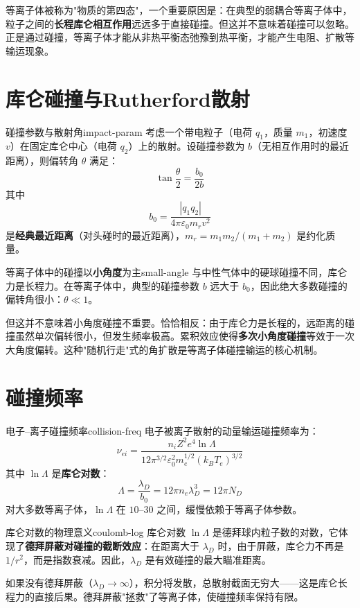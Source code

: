 \documentclass[12pt,a4paper,openany,oneside]{book}
\newcommand{\eps}{\varepsilon}
\newcommand{\difficulty}[1]{\marginnote{\textcolor{red}{\textbf{[#1]}}}}
\begin{document}
等离子体被称为"物质的第四态"，一个重要原因是：在典型的弱耦合等离子体中，粒子之间的\textbf{长程库仑相互作用}远远多于直接碰撞。但这并不意味着碰撞可以忽略。正是通过碰撞，等离子体才能从非热平衡态弛豫到热平衡，才能产生电阻、扩散等输运现象。

\section{库仑碰撞与Rutherford散射}\difficulty{基础}

\begin{definition}{碰撞参数与散射角}{impact-param}
考虑一个带电粒子（电荷 $q_1$，质量 $m_1$，初速度 $v$）在固定库仑中心（电荷 $q_2$）上的散射。设碰撞参数为 $b$（无相互作用时的最近距离），则偏转角 $\theta$ 满足：
\[
\tan\frac{\theta}{2} = \frac{b_0}{2b}
\]
其中
\[
b_0 = \frac{|q_1 q_2|}{4\pi\eps_0 m_r v^2}
\]
是\textbf{经典最近距离}（对头碰时的最近距离），$m_r = m_1 m_2/(m_1+m_2)$ 是约化质量。
\end{definition}

\begin{insight}{等离子体中的碰撞以\textbf{小角度}为主}{small-angle}
与中性气体中的硬球碰撞不同，库仑力是长程力。在等离子体中，典型的碰撞参数 $b$ 远大于 $b_0$，因此绝大多数碰撞的偏转角很小：$\theta \ll 1$。

但这并不意味着小角度碰撞不重要。恰恰相反：由于库仑力是长程的，远距离的碰撞虽然单次偏转很小，但发生频率极高。累积效应使得\textbf{多次小角度碰撞}等效于一次大角度偏转。这种"随机行走"式的角扩散是等离子体碰撞输运的核心机制。
\end{insight}

\section{碰撞频率}\difficulty{提高}

\begin{theorem}{电子--离子碰撞频率}{collision-freq}
电子被离子散射的动量输运碰撞频率为：
\[
\nu_{ei} = \frac{n_i Z^2 e^4 \ln\Lambda}{12\pi^{3/2}\eps_0^2 m_e^{1/2}(k_B T_e)^{3/2}}
\]
其中 $\ln\Lambda$ 是\textbf{库仑对数}：
\[
\Lambda = \frac{\lambda_D}{b_0} = 12\pi n_e \lambda_D^3 = 12\pi N_D
\]
对大多数等离子体，$\ln\Lambda$ 在 $10$--$30$ 之间，缓慢依赖于等离子体参数。
\end{theorem}

\begin{insight}{库仑对数的物理意义}{coulomb-log}
库仑对数 $\ln\Lambda$ 是德拜球内粒子数的对数，它体现了\textbf{德拜屏蔽对碰撞的截断效应}：在距离大于 $\lambda_D$ 时，由于屏蔽，库仑力不再是 $1/r^2$，而是指数衰减。因此，$\lambda_D$ 是有效碰撞的最大瞄准距离。

如果没有德拜屏蔽（$\lambda_D \to \infty$），积分将发散，总散射截面无穷大——这是库仑长程力的直接后果。德拜屏蔽"拯救"了等离子体，使碰撞频率保持有限。
\end{insight}
\end{document}
